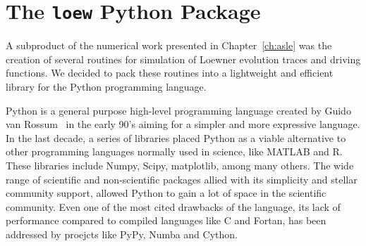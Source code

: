 \chapter{The \texttt{loew} Python Package}
\label{ch:py}

A subproduct of the numerical work presented in Chapter~\ref{ch:asle} was the
creation of several routines for simulation of Loewner evolution traces and
driving functions. We decided to pack these routines into a lightweight and
efficient library for the Python programming language.

Python is a general purpose high-level programming language created by Guido
van Rossum~\cite{vanRossum1995} in the early 90's aiming for a simpler and more
expressive language. In the last decade, a series of libraries placed Python as
a viable alternative to other programming languages normally used in science,
like MATLAB and R. These libraries include Numpy, Scipy, matplotlib, among many
others. The wide range of scientific and non-scientific packages allied with
its simplicity and stellar community support, allowed Python to gain a lot of
space in the scientific community. Even one of the most cited drawbacks of the
language, its lack of performance compared to compiled languages like C and
Fortan, has been addressed by proejcts like PyPy, Numba and Cython.
